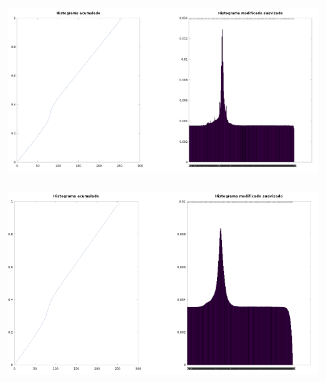 \documentclass{article}
\begin{document}
\begin{figure}[H]
    \begin{subfigure}{0.5\textwidth}
        \includegraphics[width=0.9\textwidth]{hpuertita10-1.png} 
    \end{subfigure}\hfill
    \begin{subfigure}{0.5\textwidth}
        \includegraphics[width=0.9\textwidth]{hpuertita10-200.png} 
    \end{subfigure}
\end{figure}
\end{document}
